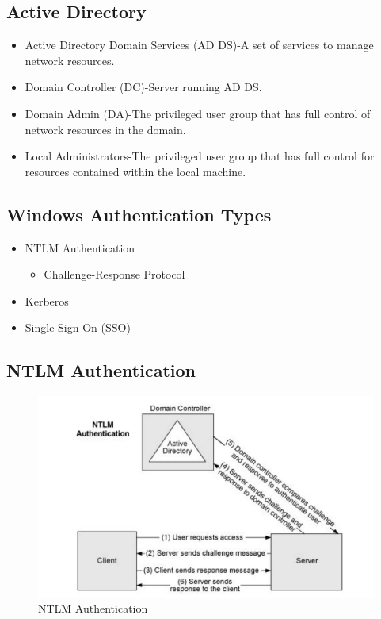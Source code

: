 \subsection{Active Directory}
\begin{itemize}
    \item Active Directory Domain Services (AD DS)-A set of services to manage network resources.
    \item Domain Controller (DC)-Server running AD DS.
    \item Domain Admin (DA)-The privileged user group that has full control of network resources in the domain.
    \item  Local Administrators-The privileged user group that has full control for resources contained within the local machine.
\end{itemize}

\subsection{Windows Authentication Types}
\begin{itemize}
    \item NTLM Authentication
    \begin{itemize}
        \item Challenge-Response Protocol
    \end{itemize}
\item Kerberos
\item Single Sign-On (SSO)
\end{itemize}

\subsection{NTLM Authentication}
\begin{figure}
    \centering
    \includegraphics[width=0.75\linewidth]{ntlmauth.png}
    \caption{NTLM Authentication}
    \label{fig:placeholder}
\end{figure}

